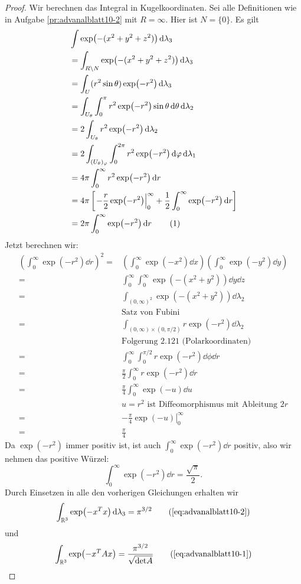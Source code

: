 \begin{proof}
	Wir berechnen das Integral in Kugelkoordinaten. Sei alle Definitionen wie in Aufgabe \ref{pr:advanalblatt10-2} mit $R=\infty$. Hier ist $N=\{0\} $. Es gilt
	\begin{align*}
	&\int\exp(-(x^2+y^2+z^2))\dd{\lambda_3}\\
	&=\int_{R\backslash N}\exp(-(x^2+y^2+z^2))\dd{\lambda_3}\\
	&=\int_{U} (r^2\sin\theta)\exp(-r^2)\dd{\lambda_3}\\
	&=\int_{U_\theta}\int_0^\pi r^2\exp(-r^2)\sin\theta\dd{\theta}\dd{\lambda_2}\\
	&=2\int_{U_\theta}r^2\exp(-r^2)\dd{\lambda_2}\\
	&=2\int_{(U_\theta)_\varphi}\int_0^{2\pi}r^2\exp(-r^2)\dd{\varphi}\dd{\lambda_1}\\
	&=4\pi\int_0^\infty r^2\exp(-r^2)\dd{r}\\
	&=4\pi\left[ \left. -\frac{r}{2}\exp(-r^2)\right|_0^\infty+\frac{1}{2}\int_0^\infty \exp(-r^2)\dd{r} \right]\\
	&=2\pi\int_0^\infty \exp(-r^2)\dd{r}\addtocounter{equation}{1}\tag{\theequation}\label{eq:advanalblatt10-2}
	\end{align*}
	Jetzt berechnen wir:
	\begin{align*}
		\left( \int_0^\infty \exp(-r^2)\dd{r} \right)^2=& \left( \int_0^\infty \exp(-x^2)\dd{x} \right) \left( \int_0^\infty \exp(-y^2)\dd{y} \right) \\
		=&\int_0^\infty \int_0^\infty \exp(-(x^2+y^2))\dd{y}\dd{z}\\
		=&\int_{(0,\infty)^2 }\exp(-(x^2+y^2))\dd{\lambda_2} \\ &\text{Satz von Fubini}\\
		=&\int_{(0,\infty)\times(0,\pi / 2)}r\exp(-r^2)\dd{\lambda_2} \\ &\text{Folgerung 2.121 (Polarkoordinaten)}\\
		=&\int_0^\infty\int_0^{\pi /2}r\exp(-r^2)\dd{\phi}\dd{r}\\
		=&\frac{\pi}{2}\int_0^\infty r\exp(-r^2)\dd{r}\\
		=&\frac{\pi}{4}\int_0^\infty \exp(-u)\dd{u} \\
		 & u=r^2\text{ ist Diffeomorphismus mit Ableitung }2r\\
		=&\left.-\frac{\pi}{4}\exp(-u)\right|_0^\infty\\
			=&\frac{\pi}{4}
	\end{align*}
	Da $\exp(-r^2)$ immer positiv ist, ist auch $\int_0^\infty \exp(-r^2)\dd{r}$ positiv, also wir nehmen das positive Würzel:
	\[
		\int_0^\infty\exp(-r^2)\dd{r}=\frac{\sqrt{\pi}}{2}
	.\] 
	Durch Einsetzen in alle den vorherigen Gleichungen erhalten wir
	\begin{equation}
		\int_{\R^3}\exp(-x^Tx)\dd{\lambda_3}=\pi^{3 / 2}\tag{\ref{eq:advanalblatt10-2}}
	\end{equation}
	und
	\begin{equation}
		\int_{\R^3}\exp(-x^TAx)=\frac{\pi^{3 / 2}}{\sqrt{\text{det} A} }\tag{\ref{eq:advanalblatt10-1}}
	\end{equation}
\end{proof}

